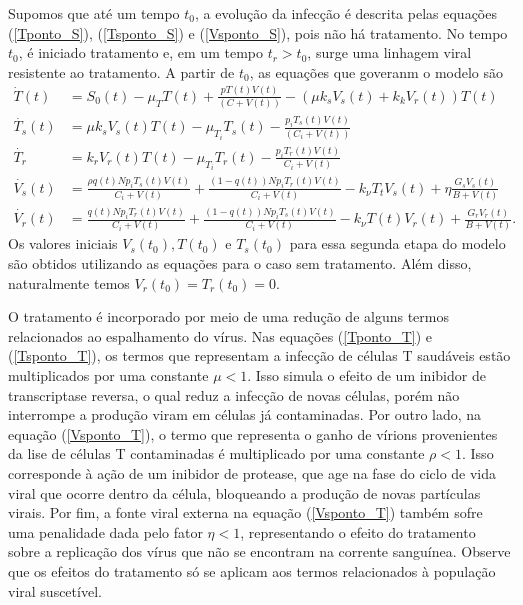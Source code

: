 Supomos que até um tempo \( t_{ 0 } \), a evolução da infecção é descrita pelas equações (\ref{Tponto_S}), (\ref{Tsponto_S}) e (\ref{Vsponto_S}), pois não há tratamento.
No tempo \( t_{ 0 } \), é iniciado tratamento e, em um tempo \( t_{ r } > t_{ 0 } \), surge uma linhagem viral resistente ao tratamento.
A partir de \( t_{ 0 } \), as equações que goveranm o modelo são
\begin{align}
    \dot{T}( t ) &= S_{ 0 } ( t ) - \mu_{ T } T ( t ) + \frac{ p T ( t ) V ( t ) }{ ( C + V ( t ) ) } - ( \mu k_{ s } V_{ s } ( t ) + k_{ k } V_{ r } ( t ) ) T ( t ) \label{Tponto_T}\\
    \dot{T_{ s }} ( t ) &= \mu k_{ s } V_{ s } ( t ) T ( t ) - \mu_{ T_{ i } } T_{ s } ( t ) - \frac{ p_{ i } T_{ s } ( t ) V ( t ) }{ ( C_{ i } + V ( t ) ) } \label{Tsponto_T} \\
    \dot{ T_{ r } } &= k_{ r } V_{ r } ( t ) T ( t ) - \mu_{ T_{ i } } T_{ r } ( t ) - \frac{ p_{ i } T_{ r } ( t ) V ( t ) }{ C_{ i } + V ( t ) } \label{Trponto_T} \\
    \dot{V_{ s } } ( t ) &= \frac{ \rho q ( t ) N p_{ i } T_{ s } ( t ) V ( t ) }{ C_{ i } + V ( t ) } + \frac{ ( 1 - q ( t ) ) N p_{ i } T_{ r } ( t ) V ( t ) }{ C_{ i } + V ( t ) } - k_{ \nu } T_{ t } V_{ s } ( t ) + \eta \frac{ G_{ s } V_{ s } ( t ) }{ B + V ( t ) } \label{Vsponto_T} \\
    \dot{ V_{ r }} ( t ) &= \frac{ q ( t ) N p_{ i } T_{ r } ( t ) V ( t ) }{ C_{ i } + V ( t ) } + \frac{ ( 1 - q ( t ) ) N p_{ i } T_{ s } ( t ) V ( t ) }{ C_{ i } + V ( t ) } - k_{ \nu } T ( t ) V_{ r } ( t ) + \frac{ G_{ r } V_{ r } ( t ) }{ B + V ( t ) } \label{Vrponto_T}
.\end{align}
Os valores iniciais \( V_{ s } ( t_{ 0 } ), T ( t_{ 0 } ) \) e \( T_{ s } ( t_{ 0 } ) \) para essa segunda etapa do modelo são obtidos utilizando as equações para o caso sem tratamento.
Além disso, naturalmente temos \( V_{ r } ( t_{ 0 } ) = T_{ r } ( t_{ 0 } ) = 0 \).

O tratamento é incorporado por meio de uma redução de alguns termos relacionados ao espalhamento do vírus.
Nas equações (\ref{Tponto_T}) e (\ref{Tsponto_T}), os termos que representam a infecção de células T saudáveis estão multiplicados por uma constante \( \mu < 1 \).
Isso simula o efeito de um inibidor de transcriptase reversa, o qual reduz a infecção de novas células, porém não interrompe a produção viram em células já contaminadas.
Por outro lado, na equação (\ref{Vsponto_T}), o termo que representa o ganho de vírions provenientes da lise de células T contaminadas é multiplicado por uma constante \( \rho < 1 \).
Isso corresponde à ação de um inibidor de protease, que age na fase do ciclo de vida viral que ocorre dentro da célula, bloqueando a produção de novas partículas virais.
Por fim, a fonte viral externa na equação (\ref{Vsponto_T}) também sofre uma penalidade dada pelo fator \( \eta < 1 \), representando o efeito do tratamento sobre a replicação dos vírus que não se encontram na corrente sanguínea.
Observe que os efeitos do tratamento só se aplicam aos termos relacionados à população viral suscetível.

